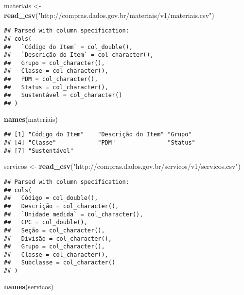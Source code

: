 \documentclass[]{article}
\newenvironment{Shaded}{\begin{snugshade}}{\end{snugshade}}
\newcommand{\KeywordTok}[1]{\textcolor[rgb]{0.13,0.29,0.53}{\textbf{#1}}}
\newcommand{\StringTok}[1]{\textcolor[rgb]{0.31,0.60,0.02}{#1}}
\newcommand{\NormalTok}[1]{#1}
\begin{document}
\begin{Shaded}
\begin{Highlighting}[]
\NormalTok{materiais <-}\StringTok{ }\KeywordTok{read_csv}\NormalTok{(}\StringTok{"http://compras.dados.gov.br/materiais/v1/materiais.csv"}\NormalTok{)}
\end{Highlighting}
\end{Shaded}

\begin{verbatim}
## Parsed with column specification:
## cols(
##   `Código do Item` = col_double(),
##   `Descrição do Item` = col_character(),
##   Grupo = col_character(),
##   Classe = col_character(),
##   PDM = col_character(),
##   Status = col_character(),
##   Sustentável = col_character()
## )
\end{verbatim}

\begin{Shaded}
\begin{Highlighting}[]
\KeywordTok{names}\NormalTok{(materiais)}
\end{Highlighting}
\end{Shaded}

\begin{verbatim}
## [1] "Código do Item"    "Descrição do Item" "Grupo"            
## [4] "Classe"            "PDM"               "Status"           
## [7] "Sustentável"
\end{verbatim}

\begin{Shaded}
\begin{Highlighting}[]
\NormalTok{servicos <-}\StringTok{ }\KeywordTok{read_csv}\NormalTok{(}\StringTok{"http://compras.dados.gov.br/servicos/v1/servicos.csv"}\NormalTok{)}
\end{Highlighting}
\end{Shaded}

\begin{verbatim}
## Parsed with column specification:
## cols(
##   Código = col_double(),
##   Descrição = col_character(),
##   `Unidade medida` = col_character(),
##   CPC = col_double(),
##   Seção = col_character(),
##   Divisão = col_character(),
##   Grupo = col_character(),
##   Classe = col_character(),
##   Subclasse = col_character()
## )
\end{verbatim}

\begin{Shaded}
\begin{Highlighting}[]
\KeywordTok{names}\NormalTok{(servicos)}
\end{Highlighting}
\end{Shaded}
\end{document}
